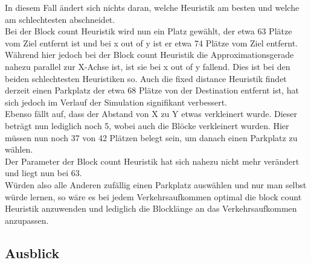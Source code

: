 In diesem Fall ändert sich nichts daran, welche Heuristik am besten und welche am schlechtesten abschneidet.\\
Bei der Block count Heuristik wird nun ein Platz gewählt, der etwa 63 Plätze vom Ziel entfernt ist und bei x out of y ist er etwa 74 Plätze vom Ziel entfernt. \\
Während hier jedoch bei der Block count Heuristik die Approximationsgerade nahezu parallel zur X-Achse ist, ist sie bei x out of y fallend. Dies ist bei den beiden schlechtesten Heuristiken so. Auch die fixed distance Heuristik findet derzeit einen Parkplatz der etwa 68 Plätze von der Destination entfernt ist, hat sich jedoch im Verlauf der Simulation signifikant verbessert.\\
Ebenso fällt auf, dass der Abstand von X zu Y etwas verkleinert wurde. Dieser beträgt nun lediglich noch 5, wobei auch die Blöcke verkleinert wurden. Hier müssen nun noch 37 von 42 Plätzen belegt sein, um danach einen Parkplatz zu wählen.\\
Der Parameter der Block count Heuristik hat sich nahezu nicht mehr verändert und liegt nun bei 63.\\

Würden also alle Anderen zufällig einen Parkplatz auswählen und nur man selbst würde lernen, so wäre es bei jedem Verkehrsaufkommen optimal die block count Heuristik anzuwenden und lediglich die Blocklänge an das Verkehrsaufkommen anzupassen. 

\subsection{Ausblick}

